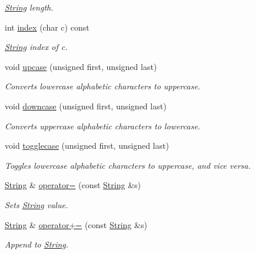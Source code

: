 \begin{DoxyCompactItemize}
\begin{DoxyCompactList}\small\item\em \hyperlink{classString}{String} length. \end{DoxyCompactList}\item 
int \hyperlink{classString_a35732025053a03087572d7b4887ce272}{index} (char c) const 
\begin{DoxyCompactList}\small\item\em \hyperlink{classString}{String} index of {\itshape c}. \end{DoxyCompactList}\item 
void \hyperlink{classString_a660ef1c6f164578528c6fe523bb24ddd}{upcase} (unsigned first, unsigned last)
\begin{DoxyCompactList}\small\item\em Converts lowercase alphabetic characters to uppercase. \end{DoxyCompactList}\item 
void \hyperlink{classString_aeb4f3ac2a19f4bb5de51991ed1ed047b}{downcase} (unsigned first, unsigned last)
\begin{DoxyCompactList}\small\item\em Converts uppercase alphabetic characters to lowercase. \end{DoxyCompactList}\item 
void \hyperlink{classString_a09a20daa7ccb207e01d191458fbc24fb}{togglecase} (unsigned first, unsigned last)
\begin{DoxyCompactList}\small\item\em Toggles lowercase alphabetic characters to uppercase, and vice versa. \end{DoxyCompactList}\item 
\hyperlink{classString}{String} \& \hyperlink{classString_a81fc5f68bb5acf8d3c83b9be872002f2}{operator=} (const \hyperlink{classString}{String} \&s)
\begin{DoxyCompactList}\small\item\em Sets \hyperlink{classString}{String} value. \end{DoxyCompactList}\item 
\hyperlink{classString}{String} \& \hyperlink{classString_a48ffaa3062eb9258440f5cb04eb447b4}{operator+=} (const \hyperlink{classString}{String} \&s)
\begin{DoxyCompactList}\small\item\em Append to \hyperlink{classString}{String}. \end{DoxyCompactList}\end{DoxyCompactItemize}

